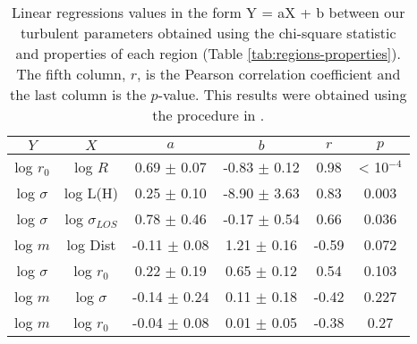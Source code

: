 \begin{table*}
\begin{center}
\caption{Linear regressions values in the form Y = aX + b between our turbulent parameters obtained using the chi-square statistic and properties of each region (Table \ref{tab:regions-properties}). The fifth column, $r$, is the Pearson correlation coefficient and the last column is the $p$-value. This results were obtained using the procedure in \citet{2007ApJ...665.1489K}.}
\begin{tabular}{cccccc}
\hline
            $Y$ &                   $X$ &                 $a$ &                 $b$ &       $r$ &      $p$ \\
\hline
    log $r_0$ &             log $R$ &   0.69 $\pm$ 0.07 &   -0.83 $\pm$ 0.12 &   0.98 &    < 10\(^{-4}\) \\
 log $\sigma$ &            log L(H) &   0.25 $\pm$ 0.10 &  -8.90 $\pm$ 3.63 &   0.83 &  0.003 \\
 log $\sigma$ &  log $\sigma_{LOS}$ &   0.78 $\pm$ 0.46 &  -0.17 $\pm$ 0.54 &   0.66 &  0.036 \\
      log $m$ &            log Dist &  -0.11 $\pm$ 0.08 &    1.21 $\pm$ 0.16 &  -0.59 &  0.072 \\
 log $\sigma$ &         log $r_{0}$ &   0.22 $\pm$ 0.19 &   0.65 $\pm$ 0.12 &   0.54 &  0.103 \\
      log $m$ &        log $\sigma$ &  -0.14 $\pm$ 0.24 &    0.11 $\pm$ 0.18 &   -0.42 &  0.227 \\
      log $m$ &         log $r_{0}$ &   -0.04 $\pm$ 0.08 &   0.01 $\pm$ 0.05 &  -0.38 &   0.27 \\
\bottomrule
\end{tabular}\label{tab:RestStats}
\end{center}
\end{table*}


